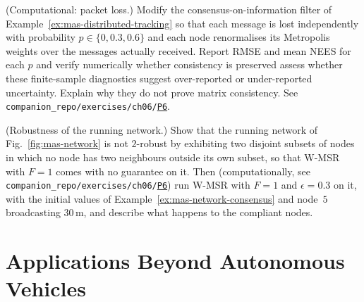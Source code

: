 \documentclass[graybox,envcountchap]{style/SNmono}
\newcommand{\repopath}[1]{\texttt{#1}}
\providecommand{\DIFadd}[1]{{\protect\color{blue} #1}} %
\providecommand{\DIFdel}[1]{{\protect\color{red} #1}} %
\providecommand{\DIFaddbegin}{} %
\providecommand{\DIFaddend}{} %
\providecommand{\DIFdelbegin}{} %
\providecommand{\DIFdelend}{} %
\DeclareRobustCommand{\RtwoDel}[1]{{\color{red}%
  \renewcommand{\DIFadd}[1]{##1}\renewcommand{\DIFdel}[1]{##1}%
  #1}}
\DeclareRobustCommand{\RtwoAdd}[1]{{\color{blue}#1}}
\DeclareRobustCommand{\codeentry}[1]{\hyperref[code:#1]{\texttt{#1}}}
\begin{document}
\begin{prob}\label{prob:ch06:6}
(Computational: packet loss.) Modify the consensus-on-information filter of Example~\ref{ex:mas-distributed-tracking} so that each message is lost independently with probability $p\in\{0,0.3,0.6\}$ and each node renormalises its Metropolis weights over the messages actually received. Report RMSE and mean NEES for each $p$ and \DIFdelbegin \DIFdel{verify numerically whether consistency is preserved}\DIFdelend \DIFaddbegin \DIFadd{assess whether these finite-sample diagnostics suggest over-reported or under-reported uncertainty. Explain why they do not prove matrix consistency}\DIFaddend . See \RtwoDel{\repopath{companion\_\allowbreak repo/\allowbreak exercises/\allowbreak ch06/\allowbreak }}\RtwoAdd{\codeentry{P6}}.
\end{prob}

\begin{prob}\label{prob:ch06:7}
(Robustness of the running network.) Show that the running network of Fig.~\ref{fig:mas-network} is not $2$-robust by exhibiting two disjoint subsets of nodes in which no node has two neighbours outside its own subset, so that W-MSR with $F=1$ comes with no guarantee on it. Then (computationally, see \RtwoDel{\repopath{companion\_\allowbreak repo/\allowbreak exercises/\allowbreak ch06/\allowbreak }}\RtwoAdd{\codeentry{P6}}) run W-MSR with $F=1$ and $\epsilon=0.3$ on it, with the initial values of Example~\ref{ex:mas-network-consensus} and node~$5$ broadcasting $30$\,m, and describe what happens to the compliant nodes.
\end{prob}




\clearpage

\clearpage

\chapter{Applications Beyond Autonomous Vehicles}
\label{sec:applications}
\end{document}
